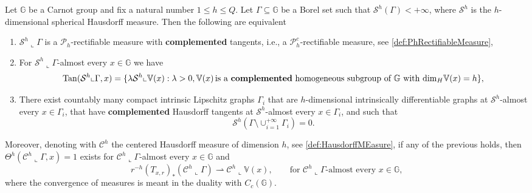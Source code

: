 \documentclass[10pt, a4paper,
oneside, headinclude,footinclude]{scrartcl}
\begin{document}
\begin{teorema}\label{thm:INTRO1Equivalence}
Let $\mathbb G$ be a Carnot group and fix a natural number $1\leq h\leq Q$. Let $\Gamma\subseteq\mathbb G$ be a Borel set such that $\mathcal{S}^h(\Gamma)<+\infty$, where $\mathcal{S}^h$ is the $h$-dimensional spherical Hausdorff measure. Then the following are equivalent
\begin{enumerate}
    \item $\mathcal{S}^h\llcorner\Gamma$ is a $\mathscr{P}_h$-rectifiable measure with \textbf{complemented} tangents, i.e., a $\mathscr{P}_h^c$-rectifiable measure, see \cref{def:PhRectifiableMeasure},
    \item For $\mathcal{S}^h\llcorner\Gamma$-almost every $x\in\mathbb G$ we have 
    $$
    \mathrm{Tan}(\mathcal{S}^h\llcorner\Gamma,x)=\{\lambda\mathcal{S}^h\llcorner\mathbb V(x):\lambda>0,\mathbb V(x)\,\text{is a \textbf{complemented} homogeneous subgroup of $\mathbb G$ with $\mathrm{dim}_H\mathbb V(x)=h$}\},
    $$
    \item There exist countably many compact intrinsic Lipschitz graphs $\Gamma_i$ that are $h$-dimensional intrinsically differentiable graphs at $\mathcal{S}^h$-almost every $x\in\Gamma_i$, that have \textbf{complemented} Hausdorff tangents at $\mathcal{S}^h$-almost every $x\in\Gamma_i$, and such that 
    $$
    \mathcal{S}^h(\Gamma\setminus\cup_{i=1}^{+\infty}\Gamma_i)=0.
    $$
\end{enumerate}
Moreover, denoting with $\mathcal{C}^h$ the centered Hausdorff measure of dimension $h$, see \cref{def:HausdorffMEasure}, if any of the previous holds, then $\Theta^{h}(\mathcal{C}^h\llcorner\Gamma,x)=1$ exists for $\mathcal{C}^h\llcorner\Gamma$-almost every $x\in\mathbb G$ and
$$
r^{-h}(T_{x,r})_*(\mathcal{C}^h\llcorner\Gamma)\rightharpoonup \mathcal{C}^h\llcorner\mathbb V(x), \qquad \text{for $\mathcal{C}^h\llcorner\Gamma$-almost every $x\in\mathbb G$,}
$$
where the convergence of measures is meant in the duality with $C_c(\mathbb G)$.
\end{teorema}
\end{document}
